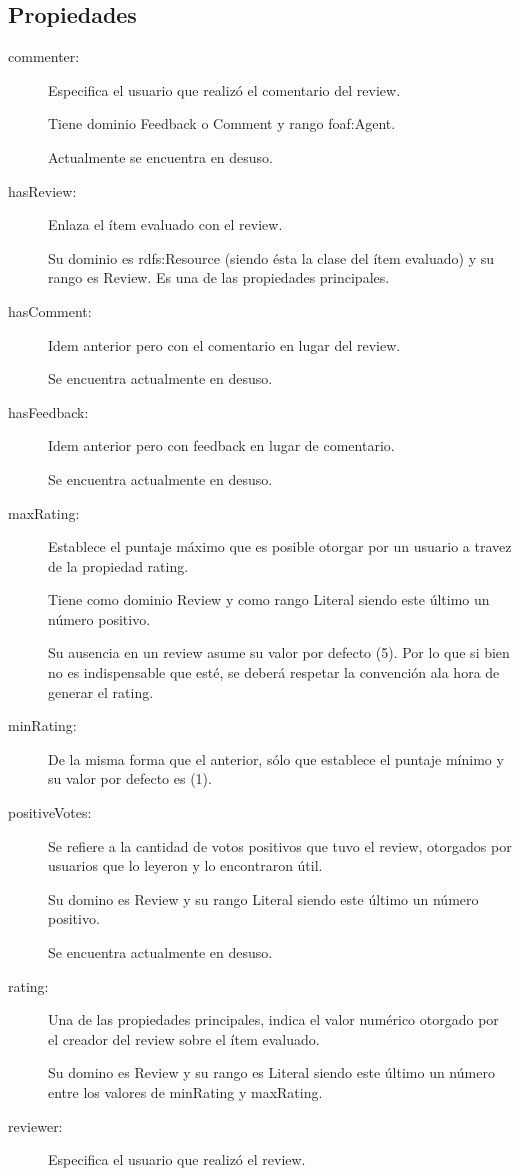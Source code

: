 \subsection{Propiedades}
 \begin{description}
  \item [commenter:] Especifica el usuario que realizó el comentario del review.
  
  Tiene dominio Feedback o Comment y rango foaf:Agent. 
  
  Actualmente se encuentra en desuso.
  \item [hasReview:] Enlaza el ítem evaluado con el review. 
  
  Su dominio es rdfs:Resource (siendo ésta la clase del ítem evaluado) y su rango es Review. Es una de 
  las propiedades principales. 
  \item [hasComment:] Idem anterior pero con el comentario en lugar del review. 
  
  Se encuentra actualmente en desuso.
  \item [hasFeedback:] Idem anterior pero con feedback en lugar de comentario. 
  
  Se encuentra actualmente en desuso.
  \item [maxRating:] Establece el puntaje máximo que es posible otorgar por un usuario a travez de la propiedad rating. 
  
  Tiene como dominio Review y como rango Literal siendo este último un número positivo. 
  
  Su ausencia en un review asume su valor por defecto (5). Por lo que si bien no es indispensable que esté, se deberá respetar 
  la convención ala hora de generar el rating.
  \item [minRating:] De la misma forma que el anterior, sólo que establece el puntaje mínimo y su valor por defecto es (1).
  \item [positiveVotes:] Se refiere a la cantidad de votos positivos que tuvo el review, otorgados por usuarios que lo leyeron y lo 
  encontraron útil. 
  
  Su domino es Review y su rango Literal siendo este último un número positivo. 
  
  Se encuentra actualmente en desuso.
  \item [rating:] Una de las propiedades principales, indica el valor numérico otorgado por el creador del review sobre el ítem evaluado. 
  
  Su domino es Review y su rango es Literal siendo este último un número entre los valores de minRating y maxRating.
  \item [reviewer:] Especifica el usuario que realizó el review. 
  

\end{description}
